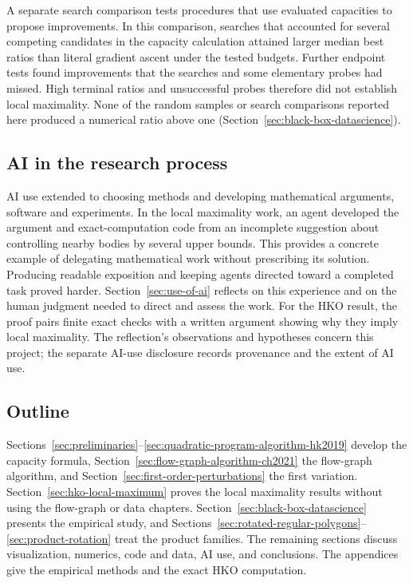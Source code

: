A separate search comparison tests procedures that use evaluated
capacities to propose improvements. In this comparison, searches that
accounted for several competing candidates in the capacity calculation
attained larger median best ratios than literal gradient ascent under
the tested budgets. Further endpoint tests found improvements that the
searches and some elementary probes had missed. High terminal ratios and
unsuccessful probes therefore did not establish local maximality.
None of the random samples or search comparisons reported here
produced a numerical ratio above one
(Section~\ref{sec:black-box-datascience}).

\subsection{AI in the research process}

AI use extended to choosing methods and developing mathematical arguments,
software and experiments. In the local maximality work, an agent developed
the argument and exact-computation code from an incomplete suggestion about
controlling nearby bodies by several upper bounds. This provides a
concrete example of delegating mathematical work without prescribing its
solution. Producing readable exposition and keeping agents directed toward
a completed task proved harder. Section~\ref{sec:use-of-ai} reflects on
this experience and on the human judgment needed to direct and assess the
work. For the HKO result, the proof pairs finite exact checks with a
written argument showing why they imply local maximality. The reflection's
observations and hypotheses concern this project; the separate
AI-use disclosure records provenance and the extent of AI use.

\subsection*{Outline}

Sections~\ref{sec:preliminaries}--\ref{sec:quadratic-program-algorithm-hk2019}
develop the capacity formula, Section~\ref{sec:flow-graph-algorithm-ch2021}
the flow-graph algorithm, and Section~\ref{sec:first-order-perturbations}
the first variation. Section~\ref{sec:hko-local-maximum} proves the local
maximality results without using the flow-graph or data chapters.
Section~\ref{sec:black-box-datascience} presents the empirical study, and
Sections~\ref{sec:rotated-regular-polygons}--\ref{sec:product-rotation}
treat the product families. The remaining sections discuss visualization,
numerics, code and data, AI use, and conclusions. The appendices give
the empirical methods and the exact HKO computation.
